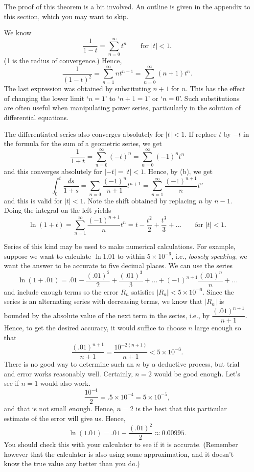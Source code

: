 The proof of this theorem is a bit involved.  An outline is given in
the appendix to this section, which you may want to skip.

\nextex
{}
We know
$$
\frac 1{1 - t} = \sum_{n=0}^\infty t^n \qquad\text{for } |t| < 1.
$$
(1 is the radius of convergence.)  Hence,
$$
\frac 1{(1 - t)^2} = \sum_{n=1}^\infty nt^{n-1} = \sum_{n=0}^\infty
   (n+1)t^n.
$$
The last expression was obtained by substituting $n + 1$ for
$n$.  This has the effect of changing the lower limit `$n = 1$' 
to `$n + 1 = 1$' or `$n = 0$'.  Such
substitutions are often useful when manipulating power series,
particularly in the solution of differential equations.

The differentiated series also converges absolutely for $|t| < 1$.
\endexample
\nextex
{}  If replace $t$ by $-t$ in the formula
for the sum of a geometric series, we get
$$
\frac 1{1 + t} = \sum_{n=0}^\infty (-t)^n = \sum_{n=0}^\infty (-1)^n t^n
$$
and this converges absolutely for $|-t| = |t| < 1$.  Hence, by (b),
we get 
$$
\int_0^t \frac{ds}{1 +s} = \sum_{n=0}\frac{(-1)^n}{n+1}t^{n+1}
    =  \sum_{n=1}^\infty \frac{(-1)^{n+1}}n t^n
$$
and this is valid for $|t| < 1$.  Note the shift obtained by
replacing $n$ by $n - 1$.   Doing the integral on the left
yields
$$
\ln (1 + t) = \sum_{n=1}^\infty \frac{(-1)^{n+1}}n t^n =
 t -\frac{t^2}2 + \frac{t^3}3 + \dots\qquad\text{for } |t| < 1.
$$

Series of this kind may be used to make numerical calculations.
For example, suppose we want to calculate $\ln 1.01$ to
within $5\times 10^{-6}$, i.e., {\it loosely speaking\/}, we want
the answer to be accurate to five decimal places.   We can use the series
$$
\ln (1 + .01) =  .01 -\frac{(.01)^2}2 + \frac{(.01)^3}3 + \dots + 
(-1)^{n+1}\frac {(.01)^n}n + \dots
$$
and include enough terms so the error $R_n$ satisfies $|R_n| < 5\times 10^{-6}$.
Since the series is an alternating series with decreasing terms,
we know that $|R_n|$ is bounded by the absolute value of
the next term in the series,
i.e., by  $\dfrac{(.01)^{n+1}}{n+1}$.  Hence, to get the desired accuracy,
it would suffice to choose $n$ large enough so that
$$
      \frac{(.01)^{n+1}}{n+1} = \frac{10^{-2(n+1)}}{n+1}   < 5 \times 10^{-6} .
$$
There is no good way to determine such an $n$ by a deductive
process, but trial and error works reasonably well.  Certainly,
$n = 2$ would be good enough.   Let's see if $n = 1$ would
also work.
$$
\frac{10^{-4}}2 = .5\times 10^{-4} = 5\times 10^{-5},
$$
and that is not small enough.  Hence, $n = 2$ is the best
that this particular estimate of the error will give us.
Hence,
$$
\ln(1.01) = .01 - \frac{(.01)^2}2 
 \approx 0.00995.
$$
You should check this with your calculator to see if it is
accurate.  (Remember however that the calculator is also using
some approximation, and it doesn't know the true value any
better than you do.)
\endexample

